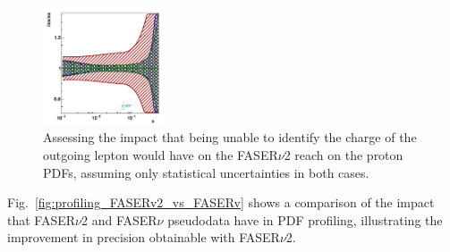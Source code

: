 \begin{figure}[t]
\includegraphics[width=0.32\textwidth]{plots/proton_fasernu2/nochargediscrimination/statOnly_FASERv2_q2_10000_pdf_s_ratio.pdf}
\caption{
Assessing the impact that being unable to identify
the charge of the outgoing lepton would have on the FASER$\nu$2 reach on the proton PDFs, assuming only statistical 
uncertainties in both cases.
}
\label{fig:profiling_nochargediscrimination}
\end{figure}


%
Fig.~\ref{fig:profiling_FASERv2_vs_FASERv} shows a comparison of the impact 
that FASER$\nu$2 and FASER$\nu$ pseudodata have in PDF profiling, illustrating 
the improvement in precision obtainable with FASER$\nu$2.

